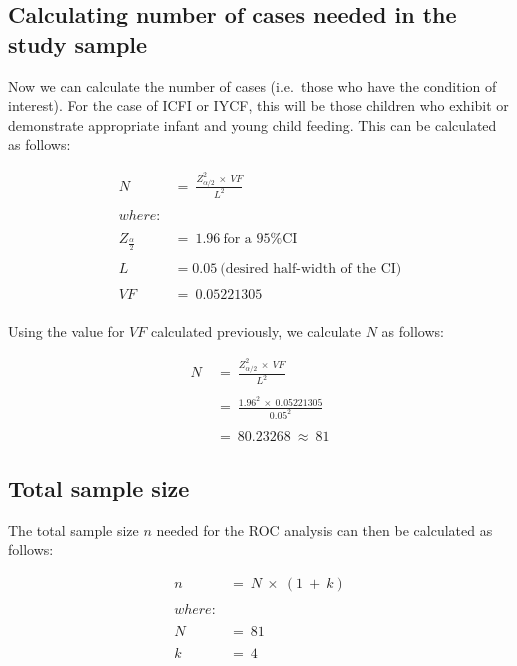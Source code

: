 \documentclass[12pt,a4paper]{article}
\theoremstyle{definition}
\theoremstyle{definition}
\theoremstyle{definition}
\theoremstyle{remark}
\begin{document}
\hypertarget{calculating-number-of-cases-needed-in-the-study-sample}{%
\subsection{Calculating number of cases needed in the study
sample}\label{calculating-number-of-cases-needed-in-the-study-sample}}

Now we can calculate the number of cases (i.e.~those who have the
condition of interest). For the case of ICFI or IYCF, this will be those
children who exhibit or demonstrate appropriate infant and young child
feeding. This can be calculated as follows:

\[ \begin{aligned}
N ~ & = ~ \frac{Z_{\alpha/2} ^ 2 ~ \times ~ VF}{L ^ 2} \\
\\
where: & \\
\\
Z_{\frac{\alpha}{2}} ~ & = ~ 1.96 ~ \text{for a 95\% CI} \\
\\
L ~ & = 0.05 ~ \text{(desired half-width of the CI)} \\
\\
VF ~ & = ~ 0.05221305  \\
\end{aligned} \]

Using the value for \(VF\) calculated previously, we calculate \(N\) as
follows:

\[ \begin{aligned}
N ~ & = ~ \frac{Z_{\alpha/2} ^ 2 ~ \times ~ VF}{L ^ 2} \\
\\
& = ~ \frac{1.96 ^ 2 ~ \times ~ 0.05221305}{0.05^ 2} \\
\\
& = ~ 80.23268 ~ \approx ~ 81
\end{aligned} \]

\hypertarget{total-sample-size}{%
\subsection{Total sample size}\label{total-sample-size}}

The total sample size \(n\) needed for the ROC analysis can then be
calculated as follows:

\[ \begin{aligned}
n ~ & = ~ N ~ \times ~ (1 ~ + ~ k)\\
\\
where: & \\
\\
N ~ & = ~ 81 \\
\\
k ~ & = ~ 4
\end{aligned} \]
\end{document}
